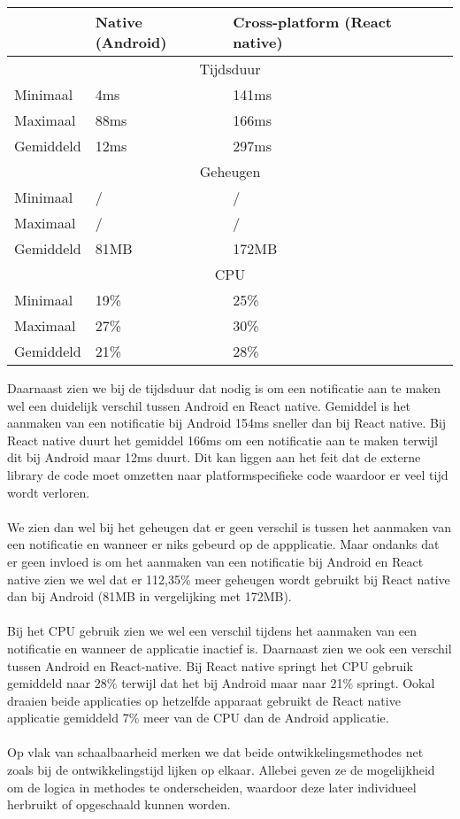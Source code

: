 \begin{tabular}{ |p{3cm}||p{5cm}|p{5cm}| }
    \hline
     & Native (Android) & Cross-platform (React native) \\
    \hline
    \multicolumn{3}{|c|}{Tijdsduur} \\
    \hline
    Minimaal & 4ms & 141ms \\
    Maximaal & 88ms & 166ms \\
    Gemiddeld & 12ms & 297ms \\
    \hline
    \multicolumn{3}{|c|}{Geheugen} \\ 
    \hline
    Minimaal & / & / \\
    Maximaal & / & / \\
    Gemiddeld & 81MB & 172MB \\
    \hline
    \multicolumn{3}{|c|}{CPU} \\
    \hline
    Minimaal & 19\% & 25\% \\
    Maximaal & 27\% & 30\% \\
    Gemiddeld & 21\% & 28\% \\
    \hline
\end{tabular}

Daarnaast zien we bij de tijdsduur dat nodig is om een notificatie aan te maken wel een duidelijk 
verschil tussen Android en React native. Gemiddel is het aanmaken van een notificatie bij Android
154ms sneller dan bij React native. Bij React native duurt het gemiddel 166ms om een notificatie 
aan te maken terwijl dit bij Android maar 12ms duurt. Dit kan liggen aan het feit dat de externe 
library de code moet omzetten naar platformspecifieke code waardoor er veel tijd wordt verloren.
\\\\
We zien dan wel bij het geheugen dat er geen verschil is tussen het aanmaken van een notificatie en wanneer er 
niks gebeurd op de appplicatie. Maar ondanks dat er geen invloed is om het aanmaken van een notificatie bij 
Android en React native zien we wel dat er 112,35\% meer geheugen wordt gebruikt bij React native dan 
bij Android (81MB in vergelijking met 172MB). 
\\\\
Bij het CPU gebruik zien we wel een verschil tijdens het aanmaken van een notificatie en wanneer de 
applicatie inactief is. Daarnaast zien we ook een verschil tussen Android en React-native. Bij React native 
springt het CPU gebruik gemiddeld naar 28\% terwijl dat het bij Android maar naar 21\% springt. Ookal 
draaien beide applicaties op hetzelfde apparaat gebruikt de React native applicatie gemiddeld 7\% meer 
van de CPU dan de Android applicatie.
\\\\
Op vlak van schaalbaarheid merken we dat beide ontwikkelingsmethodes net zoals bij de ontwikkelingstijd 
lijken op elkaar. Allebei geven ze de mogelijkheid om de logica in methodes te onderscheiden, 
waardoor deze later individueel herbruikt of opgeschaald kunnen worden.
























